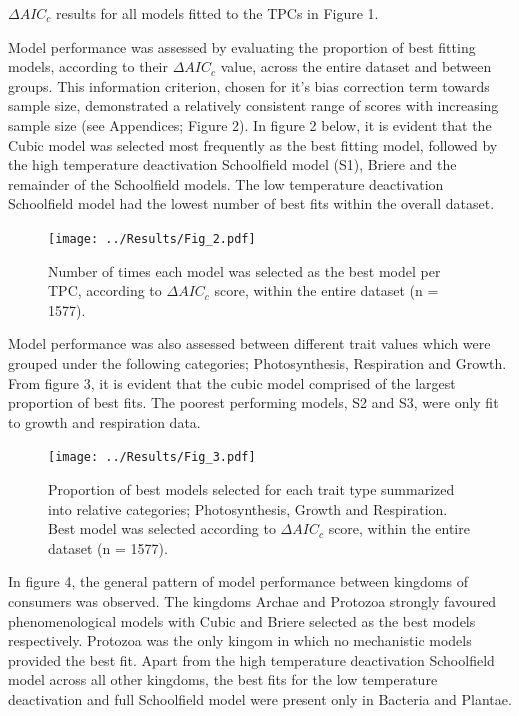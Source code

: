 \documentclass[11pt]{article}
\begin{document}
\begin{linenumbers}
\vspace{0.3cm}
\begin{table}[H]
\FloatBarrier
\centering
\caption{\(\Delta AIC_c\) results for all models fitted to the TPCs in Figure 1.}
\begin{adjustbox}{height = 1.3cm, width=12cm}
	
	\FloatBarrier
\end{adjustbox}
\end{table}
\vspace{0.5cm}
Model performance was assessed by evaluating the proportion of best fitting models, according to their \(\Delta AIC_c\) value, across the entire dataset and between groups. This information criterion, chosen for it's bias correction term towards sample size, demonstrated a relatively consistent range of scores with increasing sample size (see Appendices; Figure 2). In figure 2 below, it is evident that the Cubic model was selected most frequently as the best fitting model, followed by the high temperature deactivation Schoolfield model (S1), Briere and the remainder of the Schoolfield models. The low temperature deactivation Schoolfield model had the lowest number of best fits within the overall dataset. 

\begin{figure}[H]
 	\texttt{[image: ../Results/Fig\_2.pdf]}
 	\centering
 	\caption{Number of times each model was selected as the best model per TPC, according to \(\Delta AIC_c\) score, within the entire dataset (n = 1577).}
\end{figure}

Model performance was also assessed between different trait values which were grouped under the following categories; Photosynthesis, Respiration and Growth. From figure 3, it is evident that the cubic model comprised of the largest proportion of best fits. The poorest performing models, S2 and S3, were only fit to growth and respiration data.

\begin{figure}[H]
	\texttt{[image: ../Results/Fig\_3.pdf]}
	\centering
	\caption{Proportion of  best models selected for each trait type summarized into relative categories; Photosynthesis, Growth and Respiration. Best model was selected according to \(\Delta AIC_c\) score, within the entire dataset (n = 1577).}
\end{figure}

In figure 4, the general pattern of model performance between kingdoms of consumers was observed. The kingdoms Archae and Protozoa strongly favoured phenomenological models with Cubic and Briere selected as the best models respectively. Protozoa was the only kingom in which no mechanistic models provided the best fit. Apart from the high temperature deactivation Schoolfield model across all other kingdoms, the best fits for the low temperature deactivation and full Schoolfield model were present only in Bacteria and Plantae.


\end{linenumbers}
\end{document}
